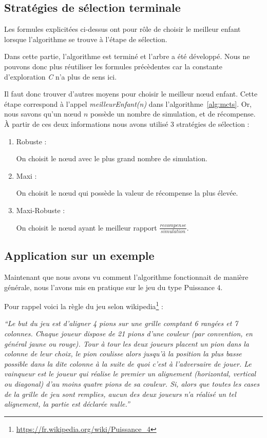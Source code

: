 \documentclass[pdftex,french, english]{article}	%
\begin{document}
	\subsection{Stratégies de sélection terminale}
	Les formules explicitées ci-dessus ont pour rôle de choisir le meilleur enfant lorsque l'algorithme se trouve à l'étape de sélection. 

	Dans cette partie, l'algorithme est terminé et l'arbre a été développé. Nous ne pouvons donc plus réutiliser les formules précèdentes car la constante d'exploration \textit{C} n'a plus de sens ici. 

Il faut donc trouver d'autres moyens pour choisir le meilleur nœud enfant. 
Cette étape correspond à l'appel \textit{meilleurEnfant(n)} dans l'algorithme~\ref{alg:mcts}. 
Or, nous savons qu'un nœud $n$ possède un nombre de simulation, et de récompense.
	À partir de ces deux informations nous avons utilisé 3 stratégies de sélection :
	\begin{enumerate}
		\item Robuste :
		
		On choisit le nœud avec le plus grand nombre de simulation.
		\item Maxi :  
		
		On choisit le nœud qui possède la valeur de récompense la plus élevée.
		\item Maxi-Robuste :
		
		On choisit le nœud ayant le meilleur rapport $\frac{recompense}{simulation}$.
	\end{enumerate}
    
    
    
    
    
	\subsection{Application sur un exemple}
	Maintenant que nous avons vu comment l'algorithme fonctionnait de manière générale, nous l'avons mis en pratique sur le jeu du type Puissance $4$. 
    

    Pour rappel voici la règle du jeu selon wikipedia\footnote{\url{https://fr.wikipedia.org/wiki/Puissance_4}} :
   
    \begin{displayquote}
    \textit{``Le but du jeu est d'aligner 4 pions sur une grille comptant 6 rangées et 7 colonnes. Chaque joueur dispose de 21 pions d'une couleur (par convention, en général jaune ou rouge). Tour à tour les deux joueurs placent un pion dans la colonne de leur choix, le pion coulisse alors jusqu'à la position la plus basse possible dans la dite colonne à la suite de quoi c'est à l'adversaire de jouer. Le vainqueur est le joueur qui réalise le premier un alignement (horizontal, vertical ou diagonal) d'au moins quatre pions de sa couleur. Si, alors que toutes les cases de la grille de jeu sont remplies, aucun des deux joueurs n'a réalisé un tel alignement, la partie est déclarée nulle.''}
   	\end{displayquote}
\end{document}
